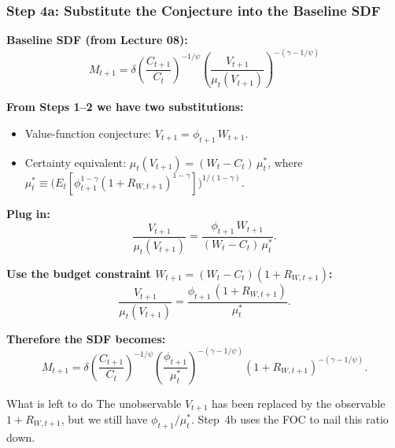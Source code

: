 \documentclass{beamer}
\begin{document}
\begin{frame}[allowframebreaks]
    \frametitle{Step 4a: Substitute the Conjecture into the Baseline SDF}

    \textbf{Baseline SDF (from Lecture 08):}
    \begin{equation*}
        M_{t+1} = \delta \left( \frac{C_{t+1}}{C_t} \right)^{-1/\psi} \left( \frac{V_{t+1}}{\mu_t(V_{t+1})} \right)^{-(\gamma-1/\psi)}
    \end{equation*}

    \textbf{From Steps 1--2 we have two substitutions:}
    \begin{itemize}
    	\item Value-function conjecture: $V_{t+1} = \phi_{t+1}\,W_{t+1}$.
    	\item Certainty equivalent: $\mu_t(V_{t+1}) = (W_t - C_t)\,\mu_t^*$, where $\mu_t^*\equiv\bigl(E_t[\phi_{t+1}^{1-\gamma}(1+R_{W,t+1})^{1-\gamma}]\bigr)^{1/(1-\gamma)}$.
    \end{itemize}

    \textbf{Plug in:}
    \begin{equation*}
        \frac{V_{t+1}}{\mu_t(V_{t+1})} = \frac{\phi_{t+1}\,W_{t+1}}{(W_t - C_t)\,\mu_t^*}.
    \end{equation*}

    \framebreak

    \textbf{Use the budget constraint $W_{t+1} = (W_t - C_t)(1 + R_{W,t+1})$:}
    \begin{equation*}
    	\frac{V_{t+1}}{\mu_t(V_{t+1})} = \frac{\phi_{t+1}\,(1 + R_{W,t+1})}{\mu_t^*}.
    \end{equation*}

    \textbf{Therefore the SDF becomes:}
    \begin{equation}\label{eq:M-after-sub}
        M_{t+1} = \delta \left( \frac{C_{t+1}}{C_t} \right)^{-1/\psi} \left(\frac{\phi_{t+1}}{\mu_t^*}\right)^{-(\gamma-1/\psi)} (1 + R_{W,t+1})^{-(\gamma-1/\psi)}.
    \end{equation}

    \begin{block}{What is left to do}
    	The unobservable $V_{t+1}$ has been replaced by the observable $1+R_{W,t+1}$, but we still have $\phi_{t+1}/\mu_t^*$. Step~4b uses the FOC to nail this ratio down.
    \end{block}
\end{frame}
\end{document}
